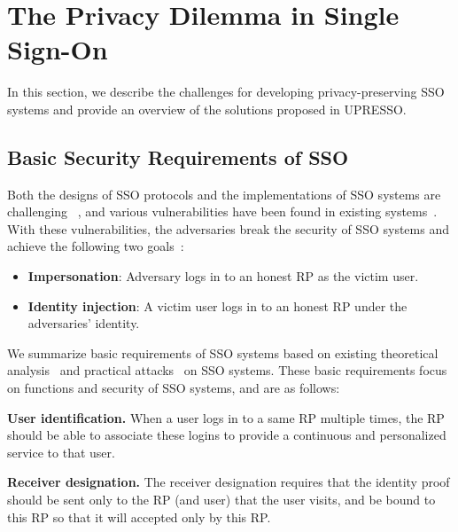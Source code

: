 \section{The Privacy Dilemma in Single Sign-On}
\label{sec:challenge}

In this section, we describe the challenges for developing privacy-preserving SSO systems and provide an overview of the solutions proposed in UPRESSO.



\subsection{Basic Security Requirements of SSO}
\label{subsec:basicrequirements}
Both the designs of SSO protocols and the implementations of SSO systems are challenging ~\cite{SPRESSO},
and various vulnerabilities have been found in existing systems~\cite{SomorovskyMSKJ12,WangCW12,ArmandoCCCPS13,ZhouE14,WangZLLYLG15,WangZLG16,YangLLZH16,MainkaMS16,MohsenS16,MainkaMSW17,YangLCZ18,YangLS17,ShiWL19}.
With these vulnerabilities, the adversaries break the security of SSO systems and achieve the following two goals~\cite{SPRESSO}:
\begin{itemize}
\item \textbf{Impersonation}: Adversary logs in to an honest RP as the victim user.
\item  \textbf{Identity injection}: A victim user logs in to an honest RP under the adversaries' identity.
\end{itemize}

We summarize basic requirements of SSO systems based on existing theoretical analysis~\cite{ArmandoCCCT08,FettKS16, FettKS17} and practical attacks~\cite{SomorovskyMSKJ12,WangCW12,ArmandoCCCPS13,ZhouE14,WangZLLYLG15,WangZLG16,YangLLZH16,MainkaMS16,MohsenS16,MainkaMSW17,YangLCZ18,YangLS17,ShiWL19} on SSO systems. These basic requirements focus on  functions and security of SSO systems, and are as follows:

\vspace{1mm}\noindent\textbf{User identification.} When a user logs in to a same RP multiple times, the RP should be able to associate these logins to provide a continuous and personalized service to that user.

\vspace{1mm}\noindent\textbf{Receiver designation.} The receiver designation requires that the identity proof should  be  sent only to the RP (and user) that the user visits, and be bound to this RP so that it will accepted only by this RP.


